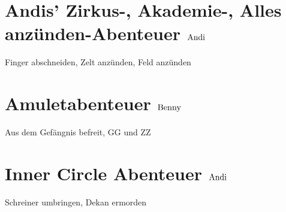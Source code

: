 \section{Andis' Zirkus-, Akademie-, Alles anz\"unden-Abenteuer \hfill $\rm{Andi}$}
Finger abschneiden, Zelt anzünden, Feld anzünden
\section{Amuletabenteuer \hfill $\rm{Benny}$}
Aus dem Gef\"angnis befreit, GG und ZZ
\section{Inner Circle Abenteuer \hfill $\rm{Andi}$}
Schreiner umbringen, Dekan ermorden
